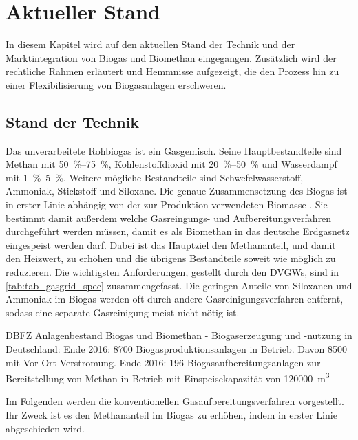 \section{Aktueller Stand}

In diesem Kapitel wird auf den aktuellen Stand der Technik und der Marktintegration von Biogas und Biomethan eingegangen. Zusätzlich wird der rechtliche Rahmen erläutert und Hemmnisse aufgezeigt, die den Prozess hin zu einer Flexibilisierung von Biogasanlagen erschweren.


\subsection{Stand der Technik}\label{chap:stateofart}

Das unverarbeitete Rohbiogas ist ein Gasgemisch. Seine Hauptbestandteile sind Methan mit \SIrange{50}{75}{\percent}, Kohlenstoffdioxid mit \SIrange{20}{50}{\percent} und Wasserdampf mit \SIrange{1}{5}{\percent}. Weitere mögliche Bestandteile sind Schwefelwasserstoff, Ammoniak, Stickstoff und Siloxane. Die genaue Zusammensetzung des Biogas ist in erster Linie abhängig von der zur Produktion verwendeten Biomasse \parencite{Rasi09}. Sie bestimmt damit außerdem welche Gasreingungs- und Aufbereitungsverfahren durchgeführt werden müssen, damit es als Biomethan in das deutsche Erdgasnetz eingespeist werden darf. Dabei ist das Hauptziel den Methananteil, und damit den Heizwert, zu erhöhen und die übrigens Bestandteile soweit wie möglich zu reduzieren. Die wichtigsten Anforderungen, gestellt durch den \glspl{DVGW}, sind in \ref{tab:tab_gasgrid_spec} zusammengefasst. Die geringen Anteile von Siloxanen und Ammoniak im Biogas werden oft durch andere Gasreinigungsverfahren entfernt, sodass eine separate Gasreinigung meist nicht nötig ist. \parencite{FNR14}\parencite{KoBi16}



DBFZ Anlagenbestand Biogas und Biomethan - Biogaserzeugung und -nutzung in Deutschland: Ende \SI{2016}{\relax}: \SI{8700}{\relax} Biogasproduktionsanlagen in Betrieb. Davon \SI{8500}{\relax} mit Vor-Ort-Verstromung. Ende \SI{2016}{\relax}: \SI{196}{\relax} Biogasaufbereitungsanlagen zur Bereitstellung von Methan in Betrieb mit Einspeisekapazität von \SI{120000}{\cubic\meter}
 \parencite{Grom17}


Im Folgenden werden die konventionellen Gasaufbereitungsverfahren vorgestellt. Ihr Zweck ist es den Methananteil im Biogas zu erhöhen, indem in erster Linie  abgeschieden wird. 



